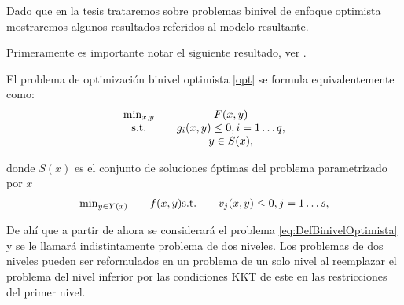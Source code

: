 Dado que en la tesis trataremos sobre problemas binivel de enfoque optimista mostraremos algunos resultados referidos al modelo resultante.

Primeramente es importante notar el siguiente resultado, ver \cite{Scmidtbiblio}.

\begin{proposition} El problema de optimización binivel optimista \eqref{opt} se formula equivalentemente como:
\begin{equation}\label{eq:DefBinivelOptimista} 
\begin{matrix}
    \min_{x , y} & \quad F(x, y) \notag \\
    \text{s.t.} & \quad g_i(x, y) \leq 0, i=1\ldots q,  \notag \\
    & \quad y \in S(x), \end{matrix}\end{equation}
  
donde $S(x)$ es el conjunto de soluciones óptimas del problema parametrizado por $x$ 
 \begin{equation}
\begin{matrix}   \min_{y \in Y(x)} & \quad f(x, y)  
    \text{s.t.} & \quad v_j(x, y) \leq 0, j=1\ldots s, \notag \end{matrix}\end{equation}


\end{proposition}
De ah\'i  que a partir de ahora se considerar\'a el problema \eqref{eq:DefBinivelOptimista} y se le llamar\'a indistintamente problema de dos niveles. 
Los  problemas de dos niveles pueden ser reformulados en un problema de un solo nivel al reemplazar el problema del nivel inferior por las condiciones KKT de este en las restricciones del primer nivel. 
		
        
